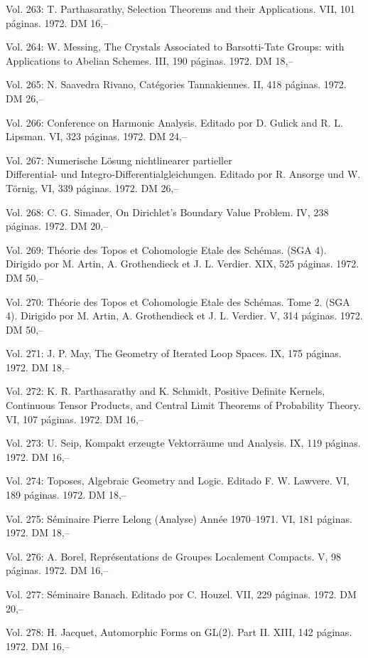 Vol. 263: T. Parthasarathy, Selection Theorems and their Applications. VII, 101 páginas. 1972. DM 16,--

Vol. 264: W. Messing, The Crystals Associated to Barsotti-Tate Groups: with Applications to Abelian Schemes. III, 190 páginas. 1972. DM 18,--

Vol. 265: N. Saavedra Rivano, Catégories Tannakiennes. II, 418 páginas. 1972. DM 26,--

Vol. 266: Conference on Harmonic Analysis. Editado por D. Gulick and R. L. Lipsman. VI, 323 páginas. 1972. DM 24,--

Vol. 267: Numerische Lösung nichtlinearer partieller\\
Differential- und Integro-Differentialgleichungen. Editado por R. Ansorge und W. Törnig, VI, 339 páginas. 1972. DM 26,--

Vol. 268: C. G. Simader, On Dirichlet's Boundary Value Problem. IV, 238 páginas. 1972. DM 20,--

Vol. 269: Théorie des Topos et Cohomologie Etale des Schémas. (SGA 4). Dirigido por M. Artin, A. Grothendieck et J. L. Verdier. XIX, 525 páginas. 1972. DM 50,--

Vol. 270: Théorie des Topos et Cohomologie Etale des Schémas. Tome 2. (SGA 4). Dirigido por M. Artin, A. Grothendieck et J. L. Verdier. V, 314 páginas. 1972. DM 50,--

Vol. 271: J. P. May, The Geometry of Iterated Loop Spaces. IX, 175 páginas. 1972. DM 18,--

Vol. 272: K. R. Parthasarathy and K. Schmidt, Positive Definite Kernels, Continuous Tensor Products, and Central Limit Theorems of Probability Theory. VI, 107 páginas. 1972. DM 16,--

Vol. 273: U. Seip, Kompakt erzeugte Vektorräume und Analysis. IX, 119 páginas. 1972. DM 16,--

Vol. 274: Toposes, Algebraic Geometry and Logic. Editado  F. W. Lawvere. VI, 189 páginas. 1972. DM 18,--

Vol. 275: Séminaire Pierre Lelong (Analyse) Année 1970--1971. VI, 181 páginas. 1972. DM 18,--

Vol. 276: A. Borel, Représentations de Groupes Localement Compacts. V, 98 páginas. 1972. DM 16,--

Vol. 277: Séminaire Banach. Editado por C. Houzel. VII, 229 páginas. 1972. DM 20,--

Vol. 278: H. Jacquet, Automorphic Forms on GL(2). Part II. XIII, 142 páginas. 1972. DM 16,--

